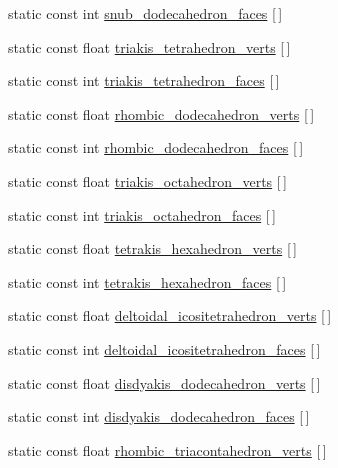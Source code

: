 \begin{DoxyCompactItemize}
static const int \hyperlink{namespacetrimesh_a62df14bff286d385532806a7330a55d8}{snub\+\_\+dodecahedron\+\_\+faces} \mbox{[}$\,$\mbox{]}
\item 
static const float \hyperlink{namespacetrimesh_a19fb6122385fea95f83873a8f40e88c8}{triakis\+\_\+tetrahedron\+\_\+verts} \mbox{[}$\,$\mbox{]}
\item 
static const int \hyperlink{namespacetrimesh_a069844dcbe1fa3d9a3b717ab89adfbad}{triakis\+\_\+tetrahedron\+\_\+faces} \mbox{[}$\,$\mbox{]}
\item 
static const float \hyperlink{namespacetrimesh_a954e330e89455e90ae5c485f69d0de8a}{rhombic\+\_\+dodecahedron\+\_\+verts} \mbox{[}$\,$\mbox{]}
\item 
static const int \hyperlink{namespacetrimesh_a7808199170e03948e6cc723a26835138}{rhombic\+\_\+dodecahedron\+\_\+faces} \mbox{[}$\,$\mbox{]}
\item 
static const float \hyperlink{namespacetrimesh_a58c4b3efff7c339b1ee7d79ec449539b}{triakis\+\_\+octahedron\+\_\+verts} \mbox{[}$\,$\mbox{]}
\item 
static const int \hyperlink{namespacetrimesh_a7b78f51d30d6a934ea05eb3abda3dcb1}{triakis\+\_\+octahedron\+\_\+faces} \mbox{[}$\,$\mbox{]}
\item 
static const float \hyperlink{namespacetrimesh_a1c3854c783d47b1a06dd4ce8077a0043}{tetrakis\+\_\+hexahedron\+\_\+verts} \mbox{[}$\,$\mbox{]}
\item 
static const int \hyperlink{namespacetrimesh_aa22cbab798d42256098ee19b9e0ec1d5}{tetrakis\+\_\+hexahedron\+\_\+faces} \mbox{[}$\,$\mbox{]}
\item 
static const float \hyperlink{namespacetrimesh_ad7f4723827f66ff283d23720818f0dcf}{deltoidal\+\_\+icositetrahedron\+\_\+verts} \mbox{[}$\,$\mbox{]}
\item 
static const int \hyperlink{namespacetrimesh_a888dd617172683266ac2ed1d6b0795a8}{deltoidal\+\_\+icositetrahedron\+\_\+faces} \mbox{[}$\,$\mbox{]}
\item 
static const float \hyperlink{namespacetrimesh_ac6d6a4e1aa99063b1cfb3921e60ff483}{disdyakis\+\_\+dodecahedron\+\_\+verts} \mbox{[}$\,$\mbox{]}
\item 
static const int \hyperlink{namespacetrimesh_a7acd0f4a3bd44c175b8efc7494c2899f}{disdyakis\+\_\+dodecahedron\+\_\+faces} \mbox{[}$\,$\mbox{]}
\item 
static const float \hyperlink{namespacetrimesh_ae7583361113f4638b8153915b253fd1b}{rhombic\+\_\+triacontahedron\+\_\+verts} \mbox{[}$\,$\mbox{]}
\item 

\end{DoxyCompactItemize}
